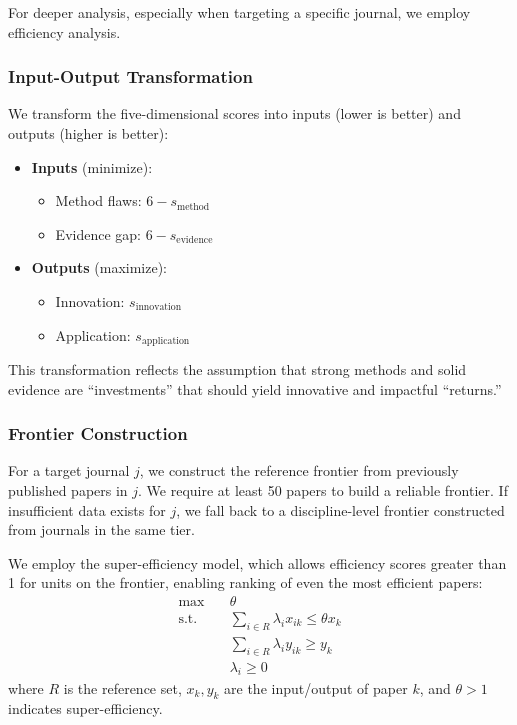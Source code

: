For deeper analysis, especially when targeting a specific journal, we employ \dea{} efficiency analysis.

\subsubsection{Input-Output Transformation}

We transform the five-dimensional scores into \dea{} inputs (lower is better) and outputs (higher is better):

\begin{itemize}
    \item \textbf{Inputs} (minimize):
    \begin{itemize}
        \item Method flaws: $6 - s_{\text{method}}$
        \item Evidence gap: $6 - s_{\text{evidence}}$
    \end{itemize}
    \item \textbf{Outputs} (maximize):
    \begin{itemize}
        \item Innovation: $s_{\text{innovation}}$
        \item Application: $s_{\text{application}}$
    \end{itemize}
\end{itemize}

This transformation reflects the assumption that strong methods and solid evidence are ``investments'' that should yield innovative and impactful ``returns.''

\subsubsection{Frontier Construction}

For a target journal $j$, we construct the reference frontier from previously published papers in $j$. We require at least 50 papers to build a reliable frontier. If insufficient data exists for $j$, we fall back to a discipline-level frontier constructed from journals in the same tier.

We employ the super-efficiency \dea{} model, which allows efficiency scores greater than 1 for units on the frontier, enabling ranking of even the most efficient papers:
\begin{align}
\max \quad & \theta \\
\text{s.t.} \quad & \sum_{i \in R} \lambda_i x_{ik} \leq \theta x_{k} \\
& \sum_{i \in R} \lambda_i y_{ik} \geq y_{k} \\
& \lambda_i \geq 0
\end{align}
where $R$ is the reference set, $x_k, y_k$ are the input/output of paper $k$, and $\theta > 1$ indicates super-efficiency.

